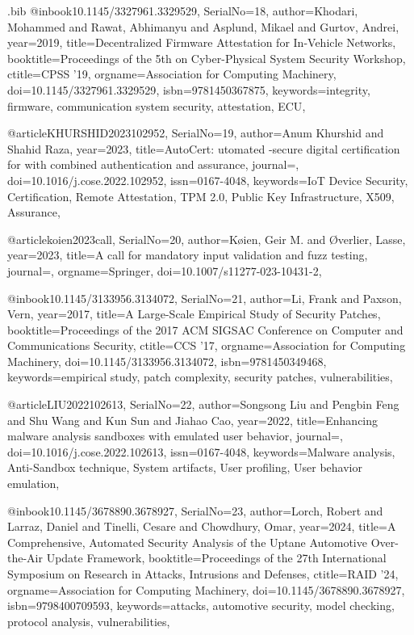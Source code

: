 \documentclass[fleqn,s1,names,tex]{neptune}
\begin{document}
\begin{bibwrite}{\jobname.bib}
@inbook{10.1145/3327961.3329529,
SerialNo={18},
author={Khodari, Mohammed and Rawat, Abhimanyu and Asplund, Mikael and Gurtov,
  Andrei},
 year={2019},
title={Decentralized Firmware Attestation for In-Vehicle Networks},
booktitle={Proceedings of the 5th on Cyber-Physical System Security Workshop},
ctitle={CPSS '19},
 orgname={Association for Computing Machinery},
doi={10.1145/3327961.3329529},
 isbn={9781450367875},
 keywords={integrity, firmware, communication system security, attestation,
  ECU},
}


@article{KHURSHID2023102952,
SerialNo={19},
author={Anum Khurshid and Shahid Raza},
 year={2023},
title={{AutoCert}: utomated -secure digital certification for {} with
  combined authentication and assurance},
journal={\rvtiopComputSecur},
doi={10.1016/j.cose.2022.102952},
 issn={0167-4048},
 keywords={IoT Device Security, Certification, Remote Attestation, TPM 2.0,
  Public Key Infrastructure, X509, Assurance},
}


@article{koien2023call,
SerialNo={20},
author={K{\o}ien, Geir M. and {\O}verlier, Lasse},
 year={2023},
title={A call for mandatory input validation and fuzz testing},
journal={\rvtiopWirelPersCommun},
 orgname={Springer},
doi={10.1007/s11277-023-10431-2},
}


@inbook{10.1145/3133956.3134072,
SerialNo={21},
author={Li, Frank and Paxson, Vern},
 year={2017},
title={A Large-Scale Empirical Study of Security Patches},
booktitle={Proceedings of the 2017 ACM SIGSAC Conference on Computer and   Communications Security},
ctitle={CCS '17},
 orgname={Association for Computing Machinery},
doi={10.1145/3133956.3134072},
 isbn={9781450349468},
 keywords={empirical study, patch complexity, security patches,
  vulnerabilities},
}


@article{LIU2022102613,
SerialNo={22},
author={Songsong Liu and Pengbin Feng and Shu Wang and Kun Sun and Jiahao
  Cao},
 year={2022},
title={Enhancing malware analysis sandboxes with emulated user behavior},
journal={\rvtiopComputSecur},
doi={10.1016/j.cose.2022.102613},
 issn={0167-4048},
 keywords={Malware analysis, Anti-Sandbox technique, System artifacts, User
  profiling, User behavior emulation},
}


@inbook{10.1145/3678890.3678927,
SerialNo={23},
author={Lorch, Robert and Larraz, Daniel and Tinelli, Cesare and Chowdhury,
  Omar},
 year={2024},
title={A Comprehensive, Automated Security Analysis of the Uptane Automotive
  Over-the-Air Update Framework},
booktitle={Proceedings of the 27th International Symposium on Research in   Attacks, Intrusions and Defenses},
 ctitle={RAID '24},
 orgname={Association for Computing Machinery},
doi={10.1145/3678890.3678927},
 isbn={9798400709593},
 keywords={attacks, automotive security, model checking, protocol analysis,
  vulnerabilities},
}



\end{bibwrite}
\end{document}
